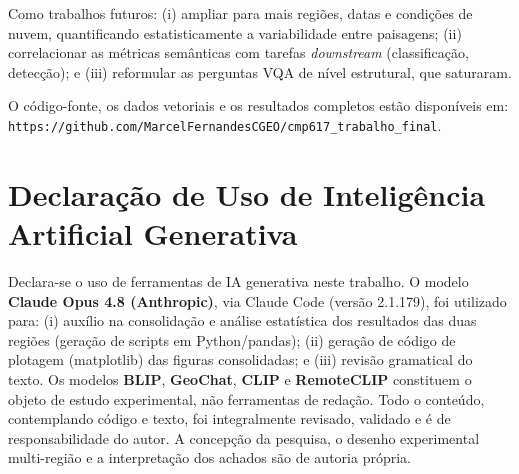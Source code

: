 \documentclass[12pt]{article}
\begin{document}
Como trabalhos futuros: (i) ampliar para mais regiões, datas e condições
de nuvem, quantificando estatisticamente a variabilidade entre paisagens;
(ii) correlacionar as métricas semânticas com tarefas \textit{downstream}
(classificação, detecção); e (iii) reformular as perguntas VQA de nível
estrutural, que saturaram.

O código-fonte, os dados vetoriais e os resultados completos estão
disponíveis em: \texttt{https://github.com/MarcelFernandesCGEO/cmp617\_trabalho\_final}.

\section*{Declaração de Uso de Inteligência Artificial Generativa}

Declara-se o uso de ferramentas de IA generativa neste
trabalho. O modelo \textbf{Claude Opus 4.8 (Anthropic)}, via Claude Code
(versão 2.1.179), foi
utilizado para: (i) auxílio na consolidação e análise estatística dos
resultados das duas regiões (geração de scripts em Python/pandas);
(ii) geração de código de plotagem (matplotlib) das figuras consolidadas;
e (iii) revisão gramatical do texto. Os modelos
\textbf{BLIP}, \textbf{GeoChat}, \textbf{CLIP} e \textbf{RemoteCLIP}
constituem o objeto de estudo experimental, não ferramentas de redação.
Todo o conteúdo, contemplando código e texto, foi integralmente revisado,
validado e é de responsabilidade do autor. A concepção da pesquisa, o
desenho experimental multi-região e a interpretação dos achados são de
autoria própria.



\end{document}
